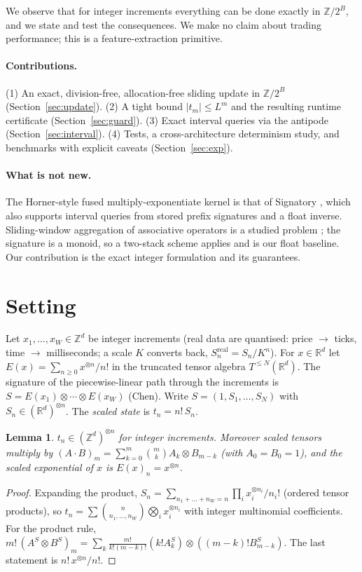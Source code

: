 \documentclass[11pt]{article}
\newtheorem{lemma}{Lemma}
\theoremstyle{remark}\newtheorem{remark}{Remark}
\newcommand{\Z}{\mathbb{Z}}
\newcommand{\R}{\mathbb{R}}
\begin{document}
We observe that for integer increments everything can be done exactly in $\Z/2^B$, and we state and test the consequences. We make no claim about trading performance; this is a feature-extraction primitive.

\paragraph{Contributions.} (1) An exact, division-free, allocation-free sliding update in $\Z/2^{B}$ (Section~\ref{sec:update}). (2) A tight bound $|t_m|\le L^m$ and the resulting runtime certificate (Section~\ref{sec:guard}). (3) Exact interval queries via the antipode (Section~\ref{sec:interval}). (4) Tests, a cross-architecture determinism study, and benchmarks with explicit caveats (Section~\ref{sec:exp}).

\paragraph{What is not new.} The Horner-style fused multiply-exponentiate kernel is that of Signatory \cite{kidger2021}, which also supports interval queries from stored prefix signatures and a float inverse. Sliding-window aggregation of associative operators is a studied problem \cite{tangwongsan2017}; the signature is a monoid, so a two-stack scheme applies and is our float baseline. Our contribution is the exact integer formulation and its guarantees.

\section{Setting}
Let $x_1,\dots,x_W\in\Z^d$ be integer increments (real data are quantised: price $\to$ ticks, time $\to$ milliseconds; a scale $K$ converts back, $S_n^{\mathrm{real}}=S_n/K^n$). For $x\in\R^d$ let $E(x)=\sum_{n\ge0}x^{\otimes n}/n!$ in the truncated tensor algebra $T^{\le N}(\R^d)$. The signature of the piecewise-linear path through the increments is $S=E(x_1)\otimes\cdots\otimes E(x_W)$ (Chen). Write $S=(1,S_1,\dots,S_N)$ with $S_n\in(\R^d)^{\otimes n}$. The \emph{scaled state} is $t_n=n!\,S_n$.

\begin{lemma}\label{lem:int}
$t_n\in(\Z^d)^{\otimes n}$ for integer increments. Moreover scaled tensors multiply by $(A\cdot B)_m=\sum_{k=0}^m\binom mk A_k\otimes B_{m-k}$ (with $A_0=B_0=1$), and the scaled exponential of $x$ is $E(x)_n=x^{\otimes n}$.
\end{lemma}
\begin{proof}
Expanding the product, $S_n=\sum_{n_1+\dots+n_W=n}\prod_i x_i^{\otimes n_i}/n_i!$ (ordered tensor products), so $t_n=\sum\binom{n}{n_1,\dots,n_W}\bigotimes_i x_i^{\otimes n_i}$ with integer multinomial coefficients. For the product rule, $m!\,(A^S\!\otimes B^S)_m=\sum_k \frac{m!}{k!(m-k)!}(k!A^S_k)\otimes((m-k)!B^S_{m-k})$. The last statement is $n!\,x^{\otimes n}/n!$.
\end{proof}
\end{document}
